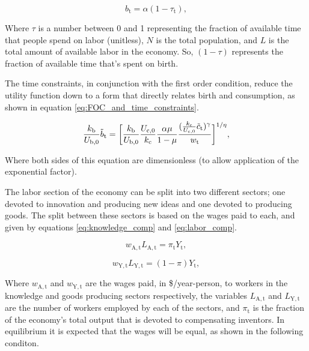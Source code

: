 \documentclass[letterpaper,12pt]{article}
\begin{document}
\begin{equation} \label{eq:birth_constraint}
b_\mathrm{t} = \alpha (1-\tau_\mathrm{t}),
\end{equation}

Where $\tau$ is a number between 0 and 1 representing the fraction of available time that people spend on labor (unitless), $N$ is the total population, and $L$ is the total amount of available labor in the economy. So, $(1-\tau)$ represents the fraction of available time that's spent on birth.

The time constraints, in conjunction with the first order condition, reduce the utility function down to a form that directly relates birth and consumption, as shown in equation \ref{eq:FOC_and_time_constraints}.

\begin{equation} \label{eq:FOC_and_time_constraints}
\frac{k_\mathrm{b}}{U_\mathrm{b,0}} \tilde b_\mathrm{t} = \bigg{[} \frac{k_\mathrm{b}}{U_\mathrm{b,0}} \frac{U_\mathrm{c,0}}{k_\mathrm{c}} \frac{\alpha \mu}{1-\mu} \frac{( \frac{k_\mathrm{c}}{U_\mathrm{c,0}} \tilde c_\mathrm{t} )^\gamma}{w_\mathrm{t}}\bigg{]}^{1/\eta} ,
\end{equation}

Where both sides of this equation are dimensionless (to allow application of the exponential factor).

The labor section of the economy can be split into two different sectors; one devoted to innovation and producing new ideas and one devoted to producing goods. The split between these sectors is based on the wages paid to each, and given by equations \ref{eq:knowledge_comp} and \ref{eq:labor_comp}.

\begin{equation} \label{eq:knowledge_comp}
w_\mathrm{A,t} L_\mathrm{A,t} = \pi_\mathrm{t} Y_\mathrm{t},
\end{equation}

\begin{equation} \label{eq:labor_comp}
w_\mathrm{Y,t} L_\mathrm{Y,t} = (1-\pi) Y_\mathrm{t},
\end{equation}

Where $w_\mathrm{A,t}$ and $w_\mathrm{Y,t}$ are the wages paid, in \$/year-person, to workers in the knowledge and goods producing sectors respectively, the variables $L_\mathrm{A,t}$ and $L_\mathrm{Y,t}$ are the number of workers employed by each of the sectors, and $\pi_\mathrm{t}$ is the fraction of the economy's total output that is devoted to compensating inventors. In equilibrium it is expected that the wages will be equal, as shown in the following conditon.
\end{document}
